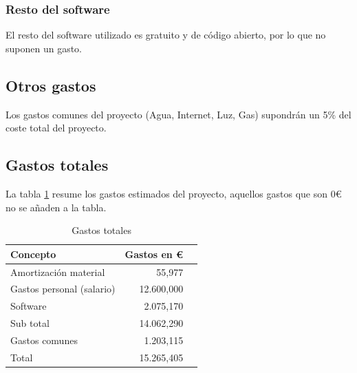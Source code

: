 \subsubsection{Resto del software}
El resto del software utilizado es gratuito y de c\'odigo abierto, por lo que no suponen
un gasto.

\subsection{Otros gastos}
Los gastos comunes del proyecto (Agua, Internet, Luz, Gas) supondr\'an un 5\% del coste
total del proyecto.

\subsection{Gastos totales}
La tabla \ref{GastosTotales} resume los gastos estimados del proyecto,
aquellos gastos que son 0€ no se a\~naden a la tabla.
\begin{table}[H]
	\begin{center}
		\begin{tabular}{l*{1}{r}r}
		    Concepto                   & Gastos en € & \\
		    \hline
		    Amortizaci\'on material    & 55,977  & \\
		    Gastos personal (salario)  & 12.600,000 & \\
		    Software                   & 2.075,170 & \\
		    \hline
		    Sub total				   & 14.062,290 & \\
		    \hline
		    Gastos comunes			   & 1.203,115 & \\
		    \hline
		    Total		               & 15.265,405 &\\
		\end{tabular}
	\caption[Gastos totales]{Gastos totales}
	\label{GastosTotales}
	\end{center}
\end{table}

